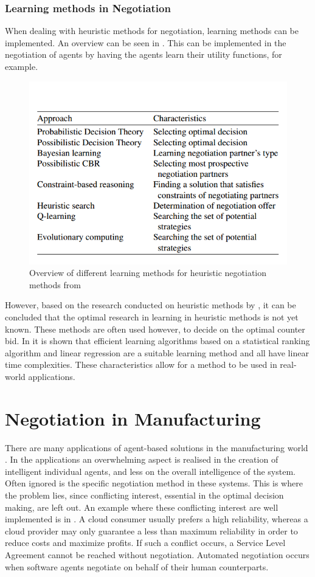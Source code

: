 \subsubsection{Learning methods in Negotiation}
\label{neg:learn}
When dealing with heuristic methods for negotiation, learning methods can be implemented. An overview can be seen in . This can be implemented in the negotiation of agents by having the agents learn their utility functions, for example. 
\begin{figure}
\centering
\includegraphics[width=0.7\linewidth]{img/negotiation_learning}
\caption{Overview of different learning methods for heuristic negotiation methods from \citet{beheshti2014homan}}
\label{fig:negotiationlearning}
\end{figure}
However, based on the research conducted on heuristic methods by \citet{jennings2001automated}, it can be concluded that the optimal research in learning in heuristic methods is not yet known. These methods are often used however, to decide on the optimal counter bid. In \citep{beheshti2014homan} it is shown that efficient learning algorithms based on a statistical ranking algorithm and linear regression are a suitable learning method and all have linear time complexities. These characteristics allow for a method to be used in real-world applications. 
\section{Negotiation in Manufacturing}
There are many applications of agent-based solutions in the manufacturing world \citep{monostori2006agent}. In the applications an overwhelming aspect is realised in the creation of intelligent individual agents, and less on the overall intelligence of the system. Often ignored is the specific negotiation method in these systems. This is where the problem lies, since conflicting interest, essential in the optimal decision making, are left out. An example where these conflicting interest are well implemented is in \citep{zheng2014cloud}. A cloud consumer usually prefers a high reliability, whereas a cloud provider may only guarantee a less than maximum reliability in order to reduce costs and maximize profits. If such a conflict occurs, a Service Level Agreement cannot be reached without negotiation. Automated negotiation occurs when software agents negotiate on behalf of their human counterparts.  

